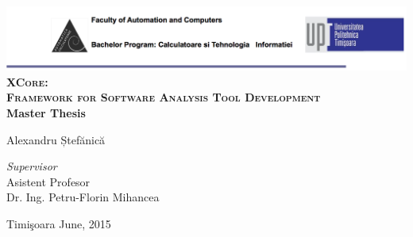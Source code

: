 \begin{titlepage}
	\begin{center}	
		\includegraphics[width=\textwidth]{../img/header.png}\\[4cm]
		
		{\huge \bfseries \textsc{XCore:\vspace{2.5mm}\\ Framework for
Software\vspace{2.5mm} Analysis Tool Development}}
		\\[3cm]
		
		{\bfseries Master Thesis} \\[3cm]
								
		\begin{flushright}
				\large Alexandru Ștefănică \\[1cm]
		\end{flushright}
		\begin{flushleft}
			 \large
				\emph{Supervisor} \\
				Asistent Profesor \\
				Dr. Ing. Petru-Florin Mihancea \\[1cm]
		\end{flushleft}
		
		{\large {Timi\c{s}oara June, 2015}}
	\end{center}
\end{titlepage}
